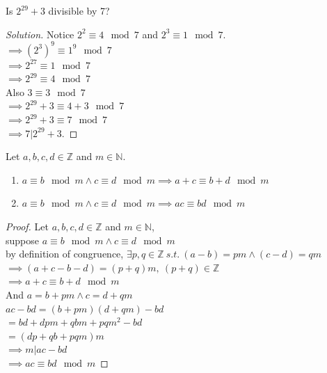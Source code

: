 \documentclass[11pt]{article}
\begin{document}
	\begin{example}[Application 2]
		Is $2^{29} + 3$ divisible by 7? \\ 
		\begin{proof}[Solution] Notice $2^2 \equiv 4 \mod 7$ and $2^3 \equiv 1 \mod 7$. \\
		$\implies (2^3)^9 \equiv 1^9 \mod 7$ \\
		$\implies 2^{27} \equiv 1 \mod 7 $ \\
		$\implies 2^{29} \equiv 4 \mod 7 $ \\
		Also $3 \equiv 3 \mod 7$ \\
		$\implies 2^{29} + 3 \equiv 4 + 3 \mod 7$ \\
		$\implies 2^{29} + 3 \equiv 7 \mod 7$ \\
		$\implies 7 | 2^{29}+3$.
		\end{proof}
	\end{example}
	
	\begin{theorem}
		Let $a, b, c, d \in \mathbb{Z}$ and $m \in \mathbb{N}$.
		\begin{enumerate}
			\item $a \equiv b \mod m \land c \equiv d \mod m \implies a + c \equiv b + d \mod m$
			\item $a \equiv b \mod m \land c \equiv d \mod m \implies ac \equiv bd \mod m$
		\end{enumerate}
	\end{theorem}
	
	\begin{proof}
		Let $a, b, c, d \in \mathbb{Z}$ and $m \in \mathbb{N}$, \\
		suppose $a \equiv b \mod m \land c \equiv d \mod m$ \\
		by definition of congruence, $\exists p, q\in \mathbb{Z}\ s.t.\ (a-b) = pm \land (c-d) = qm$\\
		$\implies (a+c-b-d) = (p+q)m,\ (p+q) \in \mathbb{Z}$ \\
		$\implies a + c \equiv b + d \mod m$ \\
		And $a = b + pm \land c = d + qm$ \\
		$ac - bd = (b + pm)(d+qm) - bd$ \\
		$=bd +dpm + qbm + pqm^2 - bd$ \\
		$=(dp+qb+pqm)m$ \\
		$\implies m | ac-bd$ \\
		$\implies ac \equiv bd \mod m$ 
	\end{proof}
	
\end{document}
